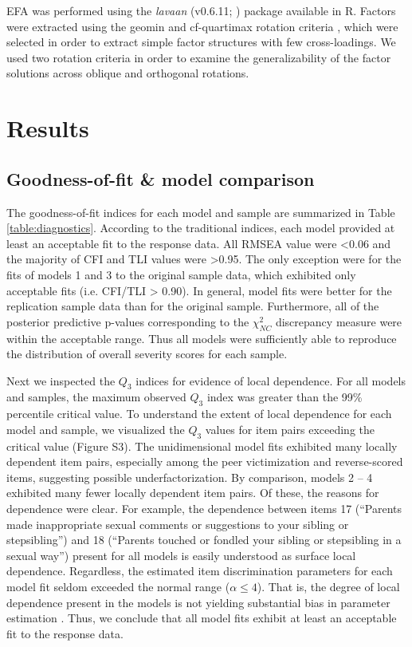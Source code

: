 \documentclass[letterpaper,man,natbib]{apa6}  %
\begin{document}
EFA was performed using the \textit{lavaan} (v0.6.11; \citealt{lavaan}) package available in R. Factors were extracted using the geomin \citep{yates1987multivariate} and cf-quartimax rotation criteria \citep{crawford1970general}, which were selected in order to extract simple factor structures with few cross-loadings. We used two rotation criteria in order to examine the generalizability of the factor solutions across oblique and orthogonal rotations. 

\section{Results}

\subsection{Goodness-of-fit \& model comparison}

The goodness-of-fit indices for each model and sample are summarized in Table \ref{table:diagnostics}. According to the traditional indices, each model provided at least an acceptable fit to the response data. All RMSEA value were <0.06 and the majority of CFI and TLI values were >0.95. The only exception were for the fits of models 1 and 3 to the original sample data, which exhibited only acceptable fits (i.e. CFI/TLI > 0.90). In general, model fits were better for the replication sample data than for the original sample. Furthermore, all of the posterior predictive p-values corresponding to the $\chi^2_{NC}$ discrepancy measure were within the acceptable range. Thus all models were sufficiently able to reproduce the distribution of overall severity scores for each sample.

Next we inspected the $Q_3$ indices for evidence of local dependence. For all models and samples, the maximum observed $Q_3$ index was greater than the 99\% percentile critical value. To understand the extent of local dependence for each model and sample, we visualized the $Q_3$ values for item pairs exceeding the critical value (Figure S3). The unidimensional model fits exhibited many locally dependent item pairs, especially among the peer victimization and reverse-scored items, suggesting possible underfactorization. By comparison, models 2 -- 4 exhibited many fewer locally dependent item pairs. Of these, the reasons for dependence were clear. For example, the dependence between items 17 (``Parents made inappropriate sexual comments or suggestions to your sibling or stepsibling'') and 18 (``Parents touched or fondled your sibling or stepsibling in a sexual way'') present for all models is easily understood as surface local dependence. Regardless, the estimated item discrimination parameters for each model fit seldom exceeded the normal range ($\alpha \leq 4$). That is, the degree of local dependence present in the models is not yielding substantial bias in parameter estimation \citep{edwards2018diagnostic}. Thus, we conclude that all model fits exhibit at least an acceptable fit to the response data.
\end{document}
